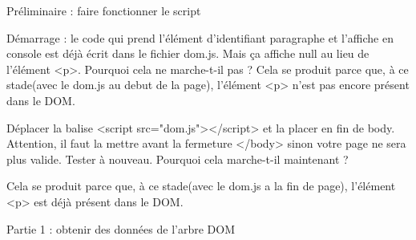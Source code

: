 Préliminaire : faire fonctionner le script

Démarrage : le code qui prend l'élément d'identifiant paragraphe et l'affiche en console est déjà écrit dans le fichier dom.js. Mais ça affiche null au lieu de l'élément <p>.
Pourquoi cela ne marche-t-il pas ?
Cela se produit parce que, à ce stade(avec le dom.js au debut de la page), l'élément <p> n'est pas encore présent dans le DOM.


Déplacer la balise <script src="dom.js"></script> et la placer en fin de body. Attention, il faut la mettre avant la fermeture </body> sinon votre page ne sera plus valide.
Tester à nouveau. Pourquoi cela marche-t-il maintenant ?

Cela se produit parce que, à ce stade(avec le dom.js a la fin de page), l'élément <p> est déjà présent dans le DOM.


Partie 1 : obtenir des données de l'arbre DOM
